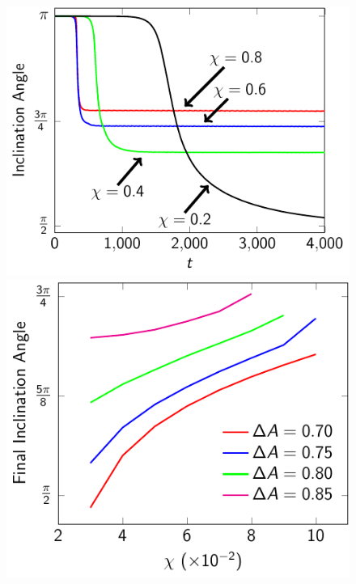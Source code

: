 \documentclass[prf,superscriptaddress,showpacs]{revtex4-1}
\begin{document}
\begin{figure}[htp]
  \begin{minipage}{0.45\textwidth}
  \centering
  \includegraphics[height=\textwidth]{figs/adR4em1adS7em1_ra070_inclinationAngle.pdf}
  \end{minipage}
  \hfill
  \begin{minipage}{0.45\textwidth}
    \includegraphics[height=\textwidth]{figs/adR4em1adS7em1_finalInclinationAngle.pdf}

\end{minipage}
\end{figure}
\end{document}
